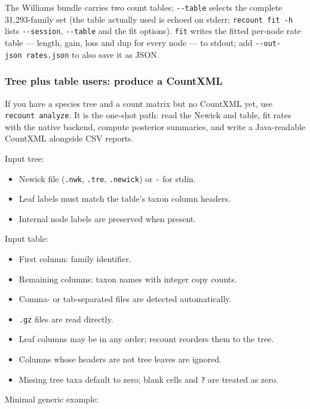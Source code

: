 \documentclass[
  10pt,
]{article}
\providecommand{\tightlist}{%
  \setlength{\itemsep}{0pt}\setlength{\parskip}{0pt}}
\begin{document}
The Williams bundle carries two count tables; \texttt{-\/-table} selects
the complete 31,293-family set (the table actually used is echoed on
stderr; \texttt{recount\ fit\ -h} lists \texttt{-\/-session},
\texttt{-\/-table} and the fit options). \texttt{fit} writes the fitted
per-node rate table --- length, gain, loss and dup for every node --- to
stdout; add \texttt{-\/-out-json\ rates.json} to also save it as JSON.

\subsubsection{Tree plus table users: produce a
CountXML}\label{tree-plus-table-users-produce-a-countxml}

If you have a species tree and a count matrix but no CountXML yet, use
\texttt{recount\ analyze}. It is the one-shot path: read the Newick and
table, fit rates with the native backend, compute posterior summaries,
and write a Java-readable CountXML alongside CSV reports.

Input tree:

\begin{itemize}
\tightlist
\item
  Newick file (\texttt{.nwk}, \texttt{.tre}, \texttt{.newick}) or
  \texttt{-} for stdin.
\item
  Leaf labels must match the table's taxon column headers.
\item
  Internal node labels are preserved when present.
\end{itemize}

Input table:

\begin{itemize}
\tightlist
\item
  First column: family identifier.
\item
  Remaining columns: taxon names with integer copy counts.
\item
  Comma- or tab-separated files are detected automatically.
\item
  \texttt{.gz} files are read directly.
\item
  Leaf columns may be in any order; recount reorders them to the tree.
\item
  Columns whose headers are not tree leaves are ignored.
\item
  Missing tree taxa default to zero; blank cells and \texttt{?} are
  treated as zero.
\end{itemize}

Minimal generic example:
\end{document}
